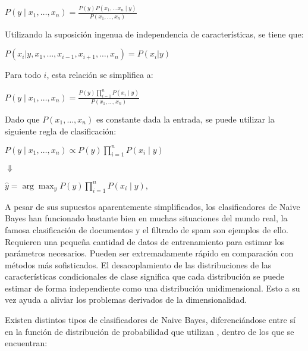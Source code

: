 \begin{center}
	$P(y \mid x_1, \dots, x_n) = \frac{P(y) P(x_1, \dots x_n \mid y)} {P(x_1, \dots, x_n)}
	$
\end{center}

Utilizando la suposición ingenua de independencia de características, se tiene que:

\begin{center}
	$P(x_i | y, x_1, \dots, x_{i-1}, x_{i+1}, \dots, x_n) = P(x_i | y)$
\end{center}

Para todo $i$, esta relación se simplifica a:

\begin{center}
	$P(y \mid x_1, \dots, x_n) = \frac{P(y) \prod_{i=1}^{n} P(x_i \mid y)} {P(x_1, \dots, x_n)}$
\end{center}

Dado que $P(x_1, \dots, x_n)$ es constante dada la entrada, se puede utilizar la siguiente regla de clasificación:

\begin{center}
	$P(y \mid x_1, \dots, x_n) \propto P(y) \prod_{i=1}^{n} P(x_i \mid y)$
	
\end{center}

\begin{center}
	$\Downarrow$ 
\end{center}
\begin{center}
	$\hat{y} = \arg\max_y P(y) \prod_{i=1}^{n} P(x_i \mid y),$
\end{center}

A pesar de sus supuestos aparentemente simplificados, los clasificadores de Naive Bayes han funcionado bastante bien en muchas situaciones del mundo real, la famosa clasificación de documentos y el filtrado de spam son ejemplos de ello. Requieren una pequeña cantidad de datos de entrenamiento para estimar los parámetros necesarios. Pueden ser extremadamente rápido en comparación con métodos más sofisticados. El desacoplamiento de las distribuciones de las características condicionales de clase significa que cada distribución se puede estimar de forma independiente como una distribución unidimensional. Esto a su vez ayuda a aliviar los problemas derivados de la dimensionalidad. 

Existen distintos tipos de clasificadores de Naive Bayes, diferenciándose entre sí en la función de distribución de probabilidad que utilizan \cite{metsis2006spam,john1995estimating,manning2010introduction}, dentro de los que se encuentran:


